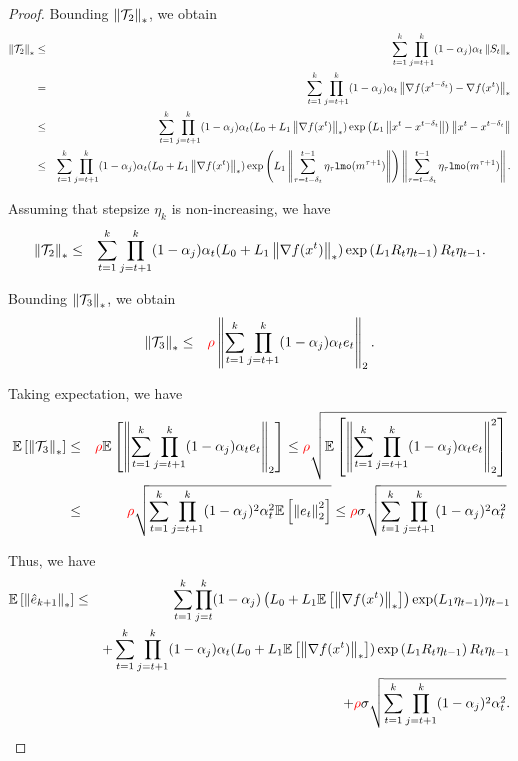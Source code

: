 \documentclass{article}
\begin{document}
\begin{proof}
Bounding $\left\| \mathcal{T}_2 \right\|_*$, we obtain 
\begin{eqnarray*}
    \left\| \mathcal{T}_2 \right\|_* &\le& \sum_{t=1}^k \prod_{j=t+1}^{k}(1-\alpha_j) \alpha_t \left\| S_t \right\|_*\\
    &=& \sum_{t=1}^k \prod_{j=t+1}^{k}(1-\alpha_j) \alpha_t \left\| \nabla f(x^{t-\delta_t}) - \nabla f(x^t) \right\|_*\\
    &\le& \sum_{t=1}^k \prod_{j=t+1}^{k}(1-\alpha_j) \alpha_t (L_0 + L_1 \left\| \nabla f(x^t) \right\|_*)\exp\left(L_1 \left\| x^t - x^{t-\delta_t} \right\|\right)\left\| x^t - x^{t-\delta_t} \right\|\\
    &\le& \sum_{t=1}^k \prod_{j=t+1}^{k}(1-\alpha_j) \alpha_t (L_0 + L_1 \left\| \nabla f(x^t) \right\|_*)\exp\left(L_1 \left\| \sum^{t-1}_{\tau = t-\delta_t}\eta_{\tau}\texttt{lmo}(m^{\tau+1}) \right\|\right)\left\| \sum^{t-1}_{\tau = t-\delta_t}\eta_{\tau}\texttt{lmo}(m^{\tau+1}) \right\|.
\end{eqnarray*}
 
Assuming that stepsize $\eta_k$ is non-increasing, we have 
\begin{eqnarray*}
    \left\| \mathcal{T}_2 \right\|_* &\le& \sum_{t=1}^k \prod_{j=t+1}^{k}(1-\alpha_j) \alpha_t (L_0 + L_1 \left\| \nabla f(x^t) \right\|_*)\exp\left(L_1 R_t\eta_{t-1}\right)R_t\eta_{t-1}.
\end{eqnarray*}

Bounding $\left\| \mathcal{T}_3 \right\|_*$, we obtain 
\begin{eqnarray*}
    \left\| \mathcal{T}_3 \right\|_* &\le& {\color{red} \rho} \left\| \sum_{t=1}^k \prod_{j=t+1}^{k}(1-\alpha_j) \alpha_t e_t \right\|_2.
\end{eqnarray*}

Taking expectation, we have 
\begin{eqnarray*}
    {\mathbb{E}}\left[\left\| \mathcal{T}_3 \right\|_*\right] &\le& {\color{red} \rho} {\mathbb{E}}\left[\left\| \sum_{t=1}^k \prod_{j=t+1}^{k}(1-\alpha_j) \alpha_t e_t \right\|_2\right]\le {\color{red} \rho} \sqrt{{\mathbb{E}}\left[\left\| \sum_{t=1}^k \prod_{j=t+1}^{k}(1-\alpha_j) \alpha_t e_t \right\|_2^2\right]}\\
    &\le& {\color{red} \rho} \sqrt{\sum_{t=1}^k \prod_{j=t+1}^{k}(1-\alpha_j)^2 \alpha_t^2 {\mathbb{E}}\left[\left\| e_t \right\|_2^2\right]}\le{\color{red} \rho} \sigma\sqrt{\sum_{t=1}^k \prod_{j=t+1}^{k}(1-\alpha_j)^2 \alpha_t^2} 
\end{eqnarray*}

Thus, we have 
\begin{eqnarray*}
    {\mathbb{E}}\left[\left\| \hat{e}_{k+1} \right\|_*\right] &\le&  \sum_{t=1}^k \prod_{j=t}^{k}(1-\alpha_j) \left(L_0 + L_1{\mathbb{E}}\left[\left\| \nabla f(x^t) \right\|_*\right]\right)\exp(L_1\eta_{t-1})\eta_{t-1}\\
    && + \sum_{t=1}^k \prod_{j=t+1}^{k}(1-\alpha_j) \alpha_t (L_0 + L_1 {\mathbb{E}}\left[\left\| \nabla f(x^t) \right\|_*\right])\exp\left(L_1 R_t\eta_{t-1}\right)R_t\eta_{t-1}\\
    && + {\color{red} \rho} \sigma\sqrt{\sum_{t=1}^k \prod_{j=t+1}^{k}(1-\alpha_j)^2 \alpha_t^2}.
\end{eqnarray*}


\end{proof}
\end{document}
